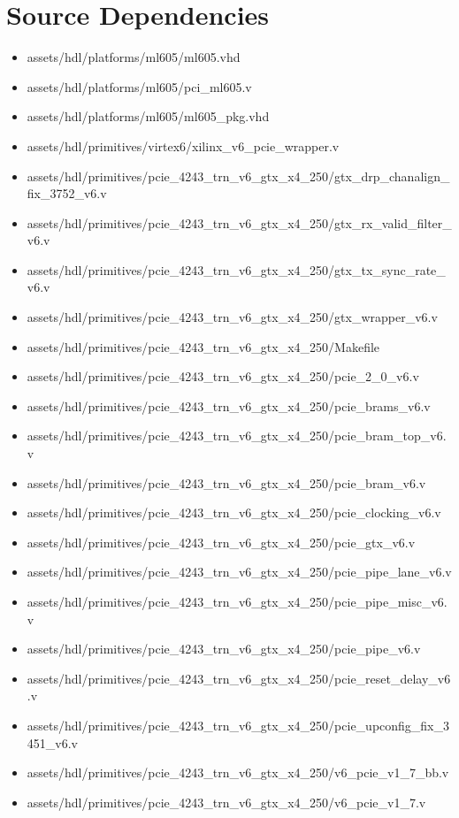 \documentclass{article}
\begin{document}
\section*{Source Dependencies}
\begin{itemize}
	\item
assets/hdl/platforms/ml605/ml605.vhd
	\item
assets/hdl/platforms/ml605/pci\_ml605.v
	\item
assets/hdl/platforms/ml605/ml605\_pkg.vhd
	\item
assets/hdl/primitives/virtex6/xilinx\_v6\_pcie\_wrapper.v
	\item
assets/hdl/primitives/pcie\_4243\_trn\_v6\_gtx\_x4\_250/gtx\_drp\_chanalign\_fix\_3752\_v6.v
	\item
assets/hdl/primitives/pcie\_4243\_trn\_v6\_gtx\_x4\_250/gtx\_rx\_valid\_filter\_v6.v
	\item
assets/hdl/primitives/pcie\_4243\_trn\_v6\_gtx\_x4\_250/gtx\_tx\_sync\_rate\_v6.v
	\item
assets/hdl/primitives/pcie\_4243\_trn\_v6\_gtx\_x4\_250/gtx\_wrapper\_v6.v
	\item
assets/hdl/primitives/pcie\_4243\_trn\_v6\_gtx\_x4\_250/Makefile
	\item
assets/hdl/primitives/pcie\_4243\_trn\_v6\_gtx\_x4\_250/pcie\_2\_0\_v6.v
	\item
assets/hdl/primitives/pcie\_4243\_trn\_v6\_gtx\_x4\_250/pcie\_brams\_v6.v
	\item
assets/hdl/primitives/pcie\_4243\_trn\_v6\_gtx\_x4\_250/pcie\_bram\_top\_v6.v
	\item
assets/hdl/primitives/pcie\_4243\_trn\_v6\_gtx\_x4\_250/pcie\_bram\_v6.v
	\item
assets/hdl/primitives/pcie\_4243\_trn\_v6\_gtx\_x4\_250/pcie\_clocking\_v6.v
	\item
assets/hdl/primitives/pcie\_4243\_trn\_v6\_gtx\_x4\_250/pcie\_gtx\_v6.v
	\item
assets/hdl/primitives/pcie\_4243\_trn\_v6\_gtx\_x4\_250/pcie\_pipe\_lane\_v6.v
	\item
assets/hdl/primitives/pcie\_4243\_trn\_v6\_gtx\_x4\_250/pcie\_pipe\_misc\_v6.v
	\item
assets/hdl/primitives/pcie\_4243\_trn\_v6\_gtx\_x4\_250/pcie\_pipe\_v6.v
	\item
assets/hdl/primitives/pcie\_4243\_trn\_v6\_gtx\_x4\_250/pcie\_reset\_delay\_v6.v
	\item
assets/hdl/primitives/pcie\_4243\_trn\_v6\_gtx\_x4\_250/pcie\_upconfig\_fix\_3451\_v6.v
	\item
assets/hdl/primitives/pcie\_4243\_trn\_v6\_gtx\_x4\_250/v6\_pcie\_v1\_7\_bb.v
	\item
assets/hdl/primitives/pcie\_4243\_trn\_v6\_gtx\_x4\_250/v6\_pcie\_v1\_7.v
\end{itemize}
\end{document}
